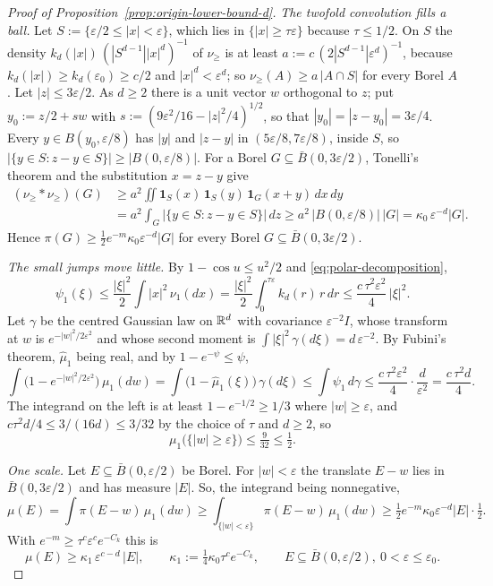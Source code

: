 \begin{proof}[Proof of Proposition~\ref{prop:origin-lower-bound-d}]
\emph{The twofold convolution fills a ball.} Let $S := \{\varepsilon/2 \le |x| < \varepsilon\}$, which
lies in $\{|x| \ge \tau\varepsilon\}$ because $\tau \le 1/2$. On $S$ the density
$k_d(|x|)\,(|S^{d-1}||x|^d)^{-1}$ of $\nu_{\ge}$ is at least
$a := c\,(2|S^{d-1}|\varepsilon^d)^{-1}$, because $k_d(|x|) \ge k_d(\varepsilon_0) \ge c/2$ and
$|x|^d < \varepsilon^d$; so $\nu_{\ge}(A) \ge a\,|A \cap S|$ for every Borel $A$. Let
$|z| \le 3\varepsilon/2$. As $d \ge 2$ there is a unit vector $w$ orthogonal to $z$; put
$y_0 := z/2 + sw$ with $s := (9\varepsilon^2/16 - |z|^2/4)^{1/2}$, so that
$|y_0| = |z - y_0| = 3\varepsilon/4$. Every $y \in B(y_0,\varepsilon/8)$ has $|y|$ and $|z - y|$ in
$(5\varepsilon/8, 7\varepsilon/8)$, inside $S$, so
$|\{y \in S : z - y \in S\}| \ge |B(0,\varepsilon/8)|$. For a Borel $G \subseteq \bar B(0,3\varepsilon/2)$,
Tonelli's theorem and the substitution $x = z - y$ give
\[
\begin{aligned}
  (\nu_{\ge} * \nu_{\ge})(G) &\ge a^2\iint\mathbf 1_S(x)\,\mathbf 1_S(y)\,\mathbf 1_G(x + y)\,dx\,dy \\
   &= a^2\int_G\bigl|\{y \in S : z - y \in S\}\bigr|\,dz
   \ge a^2\,\bigl|B(0,\varepsilon/8)\bigr|\,|G| = \kappa_0\,\varepsilon^{-d}|G| .
\end{aligned}
\]
Hence $\pi(G) \ge \tfrac12 e^{-m}\kappa_0\varepsilon^{-d}|G|$ for every Borel
$G \subseteq \bar B(0, 3\varepsilon/2)$.

\emph{The small jumps move little.} By $1 - \cos u \le u^2/2$ and \ref{eq:polar-decomposition},
\[
  \psi_1(\xi) \le \frac{|\xi|^2}{2}\int|x|^2\,\nu_1(dx)
   = \frac{|\xi|^2}{2}\int_0^{\tau\varepsilon}k_d(r)\,r\,dr
   \le \frac{c\,\tau^2\varepsilon^2}{4}\,|\xi|^2 .
\]
Let $\gamma$ be the centred Gaussian law on $\mathbb{R}^d$ with covariance $\varepsilon^{-2}I$, whose
transform at $w$ is $e^{-|w|^2/2\varepsilon^2}$ and whose second moment is
$\int|\xi|^2\,\gamma(d\xi) = d\,\varepsilon^{-2}$. By Fubini's theorem, $\widehat\mu_1$ being real,
and by $1 - e^{-\psi} \le \psi$,
\[
  \int\bigl(1 - e^{-|w|^2/2\varepsilon^2}\bigr)\,\mu_1(dw)
   = \int\bigl(1 - \widehat\mu_1(\xi)\bigr)\,\gamma(d\xi)
   \le \int\psi_1\,d\gamma
   \le \frac{c\,\tau^2\varepsilon^2}{4}\cdot\frac{d}{\varepsilon^2} = \frac{c\,\tau^2 d}{4} .
\]
The integrand on the left is at least $1 - e^{-1/2} \ge 1/3$ where $|w| \ge \varepsilon$, and
$c\tau^2 d/4 \le 3/(16d) \le 3/32$ by the choice of $\tau$ and $d \ge 2$, so
\[
  \mu_1\bigl(\{|w| \ge \varepsilon\}\bigr) \le \tfrac{9}{32} \le \tfrac12 .
\]

\emph{One scale.} Let $E \subseteq \bar B(0,\varepsilon/2)$ be Borel. For $|w| < \varepsilon$ the
translate $E - w$ lies in $\bar B(0,3\varepsilon/2)$ and has measure $|E|$. So, the integrand being
nonnegative,
\[
  \mu(E) = \int\pi(E - w)\,\mu_1(dw)
   \ge \int_{\{|w|<\varepsilon\}}\pi(E - w)\,\mu_1(dw)
   \ge \tfrac12 e^{-m}\kappa_0\varepsilon^{-d}|E|\cdot\tfrac12 .
\]
With $e^{-m} \ge \tau^c\varepsilon^c e^{-C_k}$ this is
\[
  \mu(E) \ge \kappa_1\,\varepsilon^{c-d}\,|E| ,\qquad
  \kappa_1 := \tfrac14\kappa_0\tau^ce^{-C_k},\qquad
  E \subseteq \bar B(0,\varepsilon/2),\ 0 < \varepsilon \le \varepsilon_0 .
\]


\end{proof}

